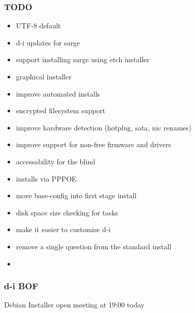 \documentclass{beamer}
\begin{document}
\begin{frame}
  \frametitle{TODO}
  	\begin{itemize}
	\item UTF-8 default
	\item d-i updates for sarge
	\item support installing sarge using etch installer
	\item graphical installer
	\item improve automated installs
	\item encrypted filesystem support
	\item improve hardware detection (hotplug, sata, nic renames)
	\item improve support for non-free firmware and drivers
	\item accessability for the blind
	\item installs via PPPOE
	\item move base-config into first stage install
	\item disk space size checking for tasks
	\item make it easier to customise d-i
	\item remove a single question from the standard install
	\item <Your idea here>
	\end{itemize}
\end{frame}

\begin{frame}
  \frametitle{d-i BOF}
  Debian Installer open meeting at 19:00 today
\end{frame}
\end{document}
